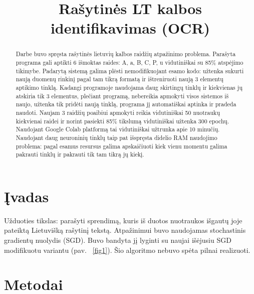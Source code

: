 \documentclass[conference]{IEEEtran}
\begin{document}
\title{Rašytinės LT kalbos identifikavimas (OCR)}

\author{
}

\maketitle

\begin{abstract}
Darbe buvo spręsta rašytinės lietuvių kalbos raidžių atpažinimo problema.
Parašyta programa gali aptikti 6 išmoktas raides: A, a, B, C, P, u vidutiniškai su
85\% atspėjimo tikimybe. Padarytą sistemą galima plėsti nemodifikuojant esamo kodo:
užtenka sukurti naują duomenų rinkinį pagal tam tikrą formatą ir ištreniruoti naują
3 elementų aptikimo tinklą. Kadangi programoje naudojama daug skirtingų tinklų ir kiekvienas
jų atskiria tik 3 elementus, plečiant programą, nebereikia apmokyti visos sistemos iš naujo,
užtenka tik pridėti naują tinklą, programa jį automatiškai aptinka ir pradeda naudoti.
Naujam 3 raidžių poaibiui apmokyti reikia vidutiniškai 50 nuotraukų kiekvienai raidei ir
norint pasiekti 85\% tikslumą vidutiniškai užtenka 300 epochų. Naudojant Google Colab
platformą tai vidutiniškai užtrunka apie 10 minučių. Naudojant daug neuroninių tinklų
taip pat išspręsta didelio RAM naudojimo problema: pagal esamus resursus galima
apskaičiuoti kiek vienu momentu galima pakrauti tinklų ir pakrauti tik tam tikrą jų
kiekį.
\end{abstract}

\section{Įvadas}
Užduoties tikslas: parašyti sprendimą, kuris iš duotos
nuotraukos išgautų joje pateiktą Lietuvišką rašytinį tekstą.
Atpažinimui buvo naudojamas stochastinis gradientų nuolydis (SGD).
Buvo bandyta jį lyginti su naujai išėjusiu SGD modifikuotu variantu (pav. ~\ref{fig1}). Šio algoritmo nebuvo spėta pilnai realizuoti.

\section{Metodai}
\end{document}
